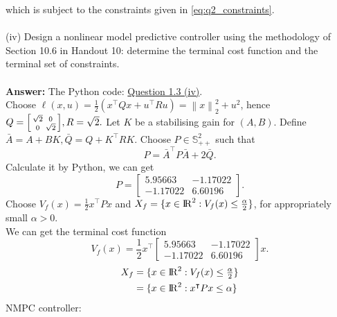 \documentclass[a4paper,11pt,reqno]{amsart}
\newcommand{\R}{{\rm I\!R}}
\newcommand{\tran}{\intercal}
\begin{document}
which is subject to the constraints given in \eqref{eq:q2_constraints}.
\\ \\
(iv) Design a nonlinear model predictive controller using the methodology of Section 10.6 in Handout 10: determine the terminal cost function and the terminal set of constraints.
\\ \\
\textbf{Answer:} 
The Python code: \href{https://github.com/Gczmy/ELE8088/blob/main/Coursework1/Python_code/3_iv.py}{Question 1.3 (iv)}.
\\
Choose $\ell(x,u)=\tfrac{1}{2}(x^{\tran}Qx+u^{\tran}Ru)=\left\lVert x\right\rVert ^2_2+u^2$, hence $Q=\begin{bsmallmatrix}\sqrt{2}&0\\0&\sqrt{2}\end{bsmallmatrix},R=\sqrt{2}.$
Let $K$ be a stabilising gain for $(A, B)$. Define $\bar{A} = A + BK, \bar{Q} = Q + K^{\tran}RK$. Choose $P\in\mathbb{S}^2_{++}$ such that
\begin{equation}
    P=\bar{A}^{\tran}P\bar{A}+2\bar{Q}.
\end{equation}
Calculate it by Python, we can get
\begin{equation}
    P=
    \begin{bmatrix}
        5.95663&-1.17022\\
        -1.17022&6.60196
    \end{bmatrix}.
\end{equation}
Choose $V_f(x)=\tfrac{1}{2}x^{\tran}Px$ and $X_f=\{x\in\R^2:V_f(x)\leq\tfrac{\alpha}{2}\}$, for appropriately small $\alpha>0$.
\\
We can get the terminal cost function
\begin{equation}
    V_f(x)=\frac{1}{2}x^{\tran}
    \begin{bmatrix}
        5.95663&-1.17022\\
        -1.17022&6.60196
    \end{bmatrix}x.
\end{equation}
\begin{align}
    X_f&=\{x\in\R^2:V_f(x)\leq\tfrac{\alpha}{2}\}
    \notag\\
    &=\{x\in\R^2:x^{\tran}Px\leq\alpha\}
\end{align}
NMPC controller:
\end{document}
